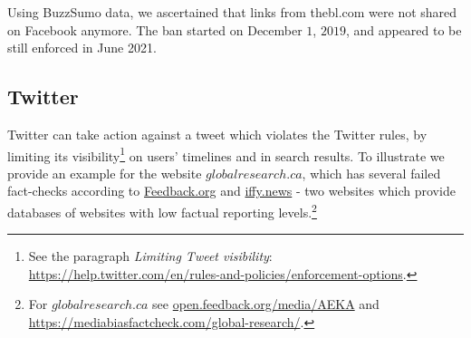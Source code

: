 \documentclass{article}
\begin{document}
Using BuzzSumo data, we ascertained that links from thebl.com were not shared on Facebook anymore. The ban started on December $1$, $2019$, and appeared to be still enforced in June 2021.

\subsection{Twitter}  \label{globalresearch}

Twitter can take action against a tweet which violates the Twitter rules, by limiting its visibility\footnote{See the paragraph {\it Limiting Tweet visibility}: \href{https://help.twitter.com/en/rules-and-policies/enforcement-options}{https://help.twitter.com/en/rules-and-policies/enforcement-options}.} on users' timelines and in search results. To illustrate we provide an example for the website $globalresearch.ca$, which has several failed fact-checks according to \href{https://open.feedback.org/media/AEKA}{Feedback.org} and \href{https://iffy.news}{iffy.news} - two websites which provide databases of websites with low factual reporting levels.\footnote{For $globalresearch.ca$ see \href{https://open.feedback.org/media/AEKA}{open.feedback.org/media/AEKA} and \href{https://mediabiasfactcheck.com/global-research/}{https://mediabiasfactcheck.com/global-research/}.}

\end{document}
